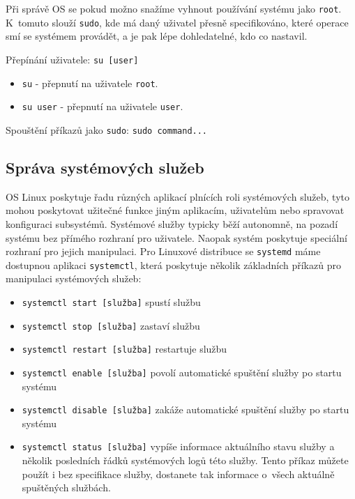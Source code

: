 Při správě OS se pokud možno snažíme vyhnout používání systému jako \texttt{root}. K~tomuto slouží \texttt{sudo},
kde má daný uživatel přesně specifikováno, které operace smí se systémem provádět, a je pak lépe dohledatelné,
kdo co nastavil.

Přepínání uživatele:
\texttt{su [user]}
\begin{itemize}
				\item \texttt{su} - přepnutí na uživatele \texttt{root}.
				\item \texttt{su user} - přepnutí na uživatele \texttt{user}.
\end{itemize}

Spouštění příkazů jako \texttt{sudo}:
\texttt{sudo command...}

\subsection{Správa systémových služeb}
\label{sluzby}

OS Linux poskytuje řadu různých aplikací plnících roli systémových služeb, tyto
mohou poskytovat užitečné funkce jiným aplikacím, uživatelům nebo spravovat
konfiguraci subsystémů. Systémové služby typicky běží autonomně, na pozadí
systému bez přímého rozhraní pro uživatele. Naopak systém poskytuje speciální
rozhraní pro jejich manipulaci. Pro Linuxové distribuce se \texttt{systemd} máme
dostupnou aplikaci \texttt{systemctl}, která poskytuje několik základních
příkazů pro manipulaci systémových služeb:
\begin{itemize}
    \item \texttt{systemctl start [služba]} spustí službu
    \item \texttt{systemctl stop [služba]} zastaví službu
    \item \texttt{systemctl restart [služba]} restartuje službu
    \item \texttt{systemctl enable [služba]} povolí automatické spuštění služby
        po startu systému
    \item \texttt{systemctl disable [služba]} zakáže automatické spuštění
        služby po startu systému
    \item \texttt{systemctl status [služba]} vypíše informace aktuálního stavu
        služby a několik posledních řádků systémových logů této služby. Tento
        příkaz můžete použít i bez specifikace služby, dostanete tak informace
        o~všech aktuálně spuštěných službách.
\end{itemize}

